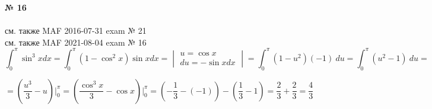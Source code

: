 \documentclass{article}
\begin{document}
\textbf{№ 16} 
\\
\\ см. также {\color{blue}MAF} 2016-07-31 exam № 21
\\ см. также {\color{blue}MAF} 2021-08-04 exam № 16
\\
$$ \int_{0}^{\pi} \sin^3{x}dx 
= \int_{0}^{\pi} (1-\cos^2{x})\sin{x}dx 
= \begin{vmatrix}   u  = \cos{x} \\ 
                    du = -\sin{x} dx \end{vmatrix}
= \int_{0}^{\pi} (1-u^2)(-1) \ du
= \int_{0}^{\pi} (u^2-1) \ du
= $$

$$ = \left( \frac{u^3}{3}-u \right) \bigg\vert_{0}^{\pi}
= \left( \frac{\cos^3{x}}{3}-\cos{x} \right) \bigg\vert_{0}^{\pi}
= \left( -\frac{1}{3} - (-1) \right) - \left( \frac{1}{3} - 1 \right)
= \frac{2}{3} + \frac{2}{3}
= \frac{4}{3}$$
\end{document}
